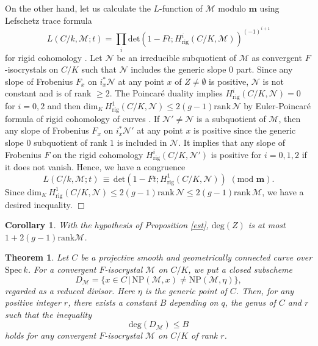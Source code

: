 \documentclass[11pt]{amsart}
\newtheorem{theorem}[Lemma]{Theorem}
\newtheorem{corollary}[Lemma]{Corollary}
\begin{document}
{{On the other hand, let us calculate the $L$-function of  $\mathcal M$ modulo $\mathbf m$ using 
Lefschetz trace formula 
$$
 L(C/k, \mathcal M; t) = \prod_i \mathrm{det}(1 - Ft; H_{\mathrm{rig}}^i(C/K, \mathcal M))^{(-1)^{i+1}}
$$
for rigid cohomology \cite[Th\'eor\`eme 6.3]{ELS}. Let $\mathcal N$ be an irreducible subquotient of $\mathcal M$ 
as convergent $F$-isocrystals on $C/K$ such that $\mathcal N$ 
includes the generic slope $0$ part. Since any slope of Frobenius $F_x$ on $i_x^\ast\mathcal N$ 
at any point $x$ of $Z \ne \emptyset$ is positive, $\mathcal N$ is not constant and is of rank $\geq 2$. 
The Poincar\'e duality \cite[Th\'eor\`eme 2.4]{Be2} implies $H^i_{\mathrm{rig}}(C/K,\mathcal N) = 0$ for $i = 0, 2$ 
and then $\mathrm{dim}_K\, H^1_{\mathrm{rig}}(C/K,\mathcal N) \leq 2(g-1)\mathrm{rank}\, \mathcal N$ 
by Euler-Poincar\'e formula of rigid cohomology of curves \cite[Corollaire 5.0-12]{CM}. 
If $\mathcal N' \ne \mathcal N$ is a subquotient of $\mathcal M$, then 
any slope of Frobenius $F_x$ on $i_x^\ast\mathcal N'$ 
at any point $x$ is positive since the generic slope $0$ subquotient of rank $1$ is included in $\mathcal N$. 
It implies that any slope of Frobenius $F$ on the rigid cohomology $H^i_{\mathrm{rig}}(C/K,\mathcal N')$ 
is positive for $i = 0, 1, 2$ if it does not vanish. 
Hence, we have a congruence 
$$
 L(C/k, \mathcal M; t)\,  \equiv\, \mathrm{det}(1 - Ft; H_{\mathrm{rig}}^1(C/K, \mathcal N))\, \, 
 (\mbox{mod}\, \, \mathbf m). 
$$
Since $\mathrm{dim}_K\, H^1_{\mathrm{rig}}(C/K,\mathcal N) \leq 2(g-1)\mathrm{rank}\, \mathcal N \leq 2(g-1)\mathrm{rank}\, \mathcal M$, 
we have a desired inequality. 
} \hspace*{\fill} $\Box$}

\begin{corollary}\label{estmax} With the hypothesis of Proposition \ref{est}, $\mathrm{deg}(Z)$ 
is at most $1 + 2(g-1)\mathrm{rank}\mathcal M$. 
\end{corollary} 

\begin{theorem}\label{estjump} Let $C$ be a projective smooth and geometrically connected curve 
over $\mathrm{Spec}\, k$. 
For a convergent $F$-isocrystal $\mathcal M$ on $C/K$, we put a closed subscheme 
$$
      D_{\mathcal M} = \{ x \in C\, |\, \mathrm{NP}(\mathcal M, x) \ne \mathrm{NP}(\mathcal M, \eta)\}, 
$$
regarded as a reduced divisor. Here $\eta$ is the generic point of $C$. Then, for any positive integer $r$, 
there exists a constant $B$ depending on $q$, the genus of $C$ and $r$ such that the inequality 
$$
     \mathrm{deg}(D_{\mathcal M}) \leq B 
$$
holds for any convergent $F$-isocrystal $\mathcal M$ on $C/K$ of rank $r$. 
\end{theorem} 
\end{document}

